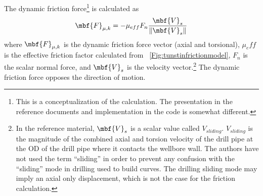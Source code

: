 The dynamic friction force\footnote{This is a conceptualization of the calculation. The presentation in the reference documents and implementation in the code is somewhat different.} is calculated as
\begin{equation}\label{dynamic_force}
  \mbf{F}_{\mu,k} = - \mu_{eff} F_{n} \frac{\mbf{V}_{s}}{\|\mbf{V}_{s}\|}
\end{equation}
where $\mbf{F}_{\mu,k}$ is the dynamic friction force vector (axial and torsional), $\mu_eff$ is the effective friction factor calculated from \equationname~\ref{Fig:tunstinfrictionmodel}, $F_n$ is the scalar normal force, and $\mbf{V}_{s}$ is the velocity vector.\footnote{In the reference material, $\mbf{V}_{s}$ is a scalar value called $V_{sliding}$. $V_{sliding}$ is the magnitude of the combined axial and torsion velocity of the drill pipe at the OD of the drill pipe where it contacts the wellbore wall.  The authors have not used the term ``sliding'' in order to prevent any confusion with the ``sliding'' mode in drilling used to build curves.  The drilling sliding mode may imply an axial only displacement, which is not the case for the friction calculation.} The dynamic friction force opposes the direction of motion.

%

